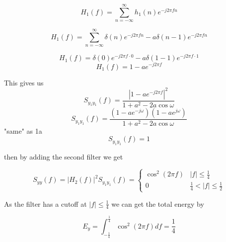 $$H_1(f)=\sum_{n=-\infty}^{\infty}h_1(n)e^{-j2\pi fn}$$

$$H_1(f)=\sum_{n=-\infty}^{\infty}\delta(n)e^{-j2\pi fn}-a \delta(n-1)e^{-j2\pi fn}$$

$$H_1(f)=\delta(0)e^{-j2\pi f\cdot 0}-a \delta(1-1)e^{-j2\pi f\cdot 1}$$
$$H_1(f)=1-ae^{-j2\pi f}$$

This gives us 
$$S_{y_1y_1}(f)=\frac{\left|1-ae^{-j2\pi f}\right|^2}{1+a^2-2 a \cos \omega}$$
$$S_{y_1y_1}(f)=\frac{\left(1-ae^{-j\omega}\right)\left(1-ae^{j\omega}\right)}{1+a^2-2 a \cos \omega}$$
"same" as 1a
$$S_{y_1y_1}(f)=1$$

then by adding the second filter we get

$$
S_{y y}(f)=\left|H_2(f)\right|^2 S_{y_1 y_1}(f)= \begin{cases}\cos ^2(2 \pi f) & |f| \leq \frac{1}{4} \\ 0 & \frac{1}{4}<|f| \leq \frac{1}{2}\end{cases}
$$

As the filter has a cutoff at $|f| \leq \frac{1}{4}$ we can get the total energy by

$$E_y=\int_{-\frac{1}{4}}^{\frac{1}{4}}\cos^2(2\pi f)df=\frac{1}{4}$$
